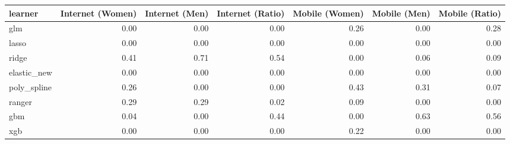 \begin{table}[ht]
\centering
\begin{tabular}{lrrrrrr}
  \toprule
learner & Internet (Women) & Internet (Men) & Internet (Ratio) & Mobile (Women) & Mobile (Men) & Mobile (Ratio) \\ 
  \midrule
glm & 0.00 & 0.00 & 0.00 & 0.26 & 0.00 & 0.28 \\ 
  lasso & 0.00 & 0.00 & 0.00 & 0.00 & 0.00 & 0.00 \\ 
  ridge & 0.41 & 0.71 & 0.54 & 0.00 & 0.06 & 0.09 \\ 
  elastic\_new & 0.00 & 0.00 & 0.00 & 0.00 & 0.00 & 0.00 \\ 
  poly\_spline & 0.26 & 0.00 & 0.00 & 0.43 & 0.31 & 0.07 \\ 
  ranger & 0.29 & 0.29 & 0.02 & 0.09 & 0.00 & 0.00 \\ 
  gbm & 0.04 & 0.00 & 0.44 & 0.00 & 0.63 & 0.56 \\ 
  xgb & 0.00 & 0.00 & 0.00 & 0.22 & 0.00 & 0.00 \\ 
   \bottomrule
\end{tabular}
\end{table}
